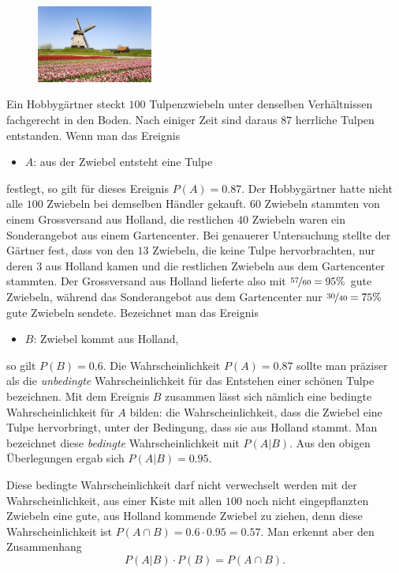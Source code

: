 \documentclass[%
11pt,%
twoside,%
titlepage,%
german,%
headsepline%
]{scrartcl}
\begin{document}
\begin{figure}
  \begin{center}
    \includegraphics[width=0.34\textwidth]{pictures/tulpen}
  \end{center}
\end{figure}
Ein Hobbygärtner steckt $100$ Tulpenzwiebeln unter denselben Verhältnissen fachgerecht in den Boden. Nach einiger Zeit sind daraus $87$ herrliche Tulpen entstanden. Wenn man das Ereignis
\begin{itemize}
    \item[] $A$: aus der Zwiebel entsteht eine Tulpe
\end{itemize}
festlegt, so gilt für dieses Ereignis $P(A)=0.87$.
Der Hobbygärtner hatte nicht alle $100$ Zwiebeln bei demselben Händler gekauft. $60$ Zwiebeln stammten von einem Grossversand aus Holland, die restlichen $40$ Zwiebeln waren ein Sonderangebot aus einem Gartencenter. Bei genauerer Untersuchung stellte der Gärtner fest, dass von den $13$ Zwiebeln, die keine Tulpe hervorbrachten, nur deren $3$ aus Holland kamen und die restlichen Zwiebeln aus dem Gartencenter stammten. Der Grossversand aus Holland lieferte also mit $\nicefrac{57}{60}=95\%$ gute Zwiebeln, während das Sonderangebot aus dem Gartencenter nur $\nicefrac{30}{40}=75\%$ gute Zwiebeln sendete. Bezeichnet man das Ereignis
\begin{itemize}
    \item[] $B$: Zwiebel kommt aus Holland,
\end{itemize}
so gilt $P(B)=0.6$.
Die Wahrscheinlichkeit $P(A)=0.87$ sollte man präziser als die \emph{unbedingte} Wahrscheinlichkeit für das Entstehen einer schönen Tulpe bezeichnen. Mit dem Ereignis $B$ zusammen lässt sich nämlich eine bedingte Wahrscheinlichkeit für $A$ bilden: die Wahrscheinlichkeit, dass die Zwiebel eine Tulpe hervorbringt, unter der Bedingung, dass sie aus Holland stammt. Man bezeichnet diese \emph{bedingte} Wahrscheinlichkeit mit $P(A|B)$.
Aus den obigen Überlegungen ergab sich $P(A|B)=0.95$.

Diese bedingte Wahrscheinlichkeit darf nicht verwechselt werden mit der Wahrscheinlichkeit, aus einer Kiste mit allen $100$ noch nicht eingepflanzten Zwiebeln eine gute, aus Holland kommende Zwiebel zu ziehen, denn diese Wahrscheinlichkeit ist $P(A\cap B)=0.6\cdot0.95 = 0.57$.
Man erkennt aber den Zusammenhang
$$P(A|B)\cdot P(B)=P(A\cap B).$$
\end{document}

